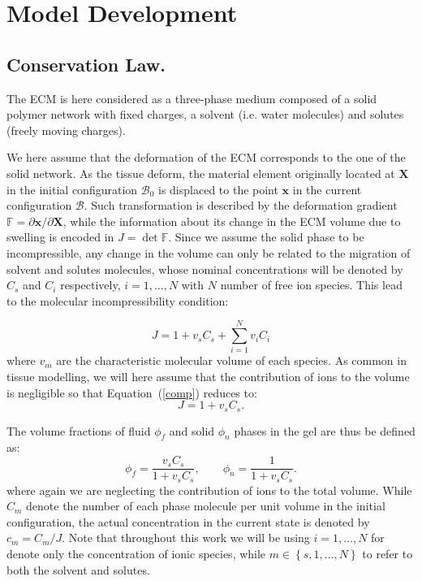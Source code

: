 \documentclass[runningheads]{llncs}
\newcommand{\F}{\ensuremath{\mathbb{F}}}
\begin{document}
\section{Model Development}
\subsection{Conservation Law.}

The ECM is here considered as a three-phase medium composed of a solid polymer network with fixed charges, a solvent (i.e. water molecules) and solutes (freely moving charges).

We here assume that the deformation of the ECM corresponds to the one of the solid network. As the tissue deform, the material element originally located at $\mathbf{X}$ in the initial configuration $\mathcal{B}_0$ is displaced to the point $\mathbf{x}$ in the current configuration $\mathcal{B}$. Such transformation is described by the deformation gradient $\F= \partial \mathbf{x}/\partial \mathbf{X}$, while the information about its change in the ECM volume due to swelling is encoded in $J= \det \F$. Since we assume the solid phase to be incompressible, any change in the volume can only be related to the migration of solvent and solutes molecules, whose nominal concentrations will be denoted by $C_s$ and $C_i$ respectively, $i=1,\ldots,N$ with $N$ number of free ion species. This lead to the molecular incompressibility condition:

\begin{equation}
 J= 1 + v_s C_s +\sum\limits_{i=1}^{N} v_i C_i
 \label{comp}
\end{equation}
where $v_m$ are the characteristic molecular volume of each species. As common in tissue modelling, we will here assume that the contribution of ions to the volume is negligible so that Equation~(\ref{comp}) reduces to:
\begin{equation}
J=1+v_s C_s.
\label{inc}
\end{equation} 

The volume fractions of fluid $\phi_f$ and solid $\phi_n$ phases in the gel are thus be defined as:
\begin{equation}
\phi_f = \frac{v_sC_s}{1+v_sC_s}, \qquad \phi_n = \frac{1}{1+v_sC_s}.
\end{equation}
where again we are neglecting the contribution of ions to the total volume.
While $C_m$ denote the number of each phase molecule per unit volume in the initial configuration, the actual concentration in the current state is denoted by $c_m=C_m/J$. Note that throughout this work we will be using $i=1,\ldots,N$ for denote only the concentration of ionic species, while $m\in\left\{s,1,\ldots,N\right\}$ to refer to both the solvent and solutes.
\end{document}
